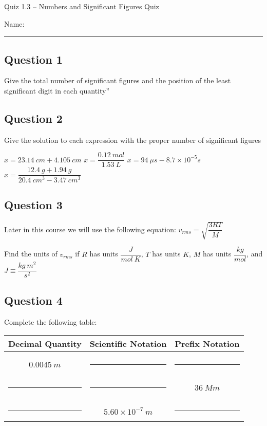 \documentclass[11pt, letterpaper]{memoir}
\begin{document}
\begin{center}
	{\large	Quiz 1.3 -- Numbers and Significant Figures Quiz}
\end{center}
{\large Name: \rule[-1mm]{4in}{.1pt}
\subsection*{Question 1}
Give the total number of significant figures and the position of the least significant digit in each quantity”


\vspace{3em}
\subsection*{Question 2}
Give the solution to each expression with the proper number of significant figures

\noindent$x = 23.14~cm+4.105~cm$ \hspace{2em} $x = \dfrac{0.12~mol}{1.53~L}$ \hspace{2em} $x=94~\mu s - 8.7\times10^{-5}s$ \hspace{2em} $x=\dfrac{12.4~g+1.94~g}{20.4~cm^3-3.47~cm^3}$

\vspace{3em}
\subsection*{Question 3}
Later in this course we will use the following equation: $v_{rms}=\sqrt{\dfrac{3RT}{M}}$

\noindent Find the units of $v_{rms}$ if $R$ has units $\dfrac{J}{mol~K}$, $T$ has units $K$, $M$ has units $\dfrac{kg}{mol}$, and $J\equiv \dfrac{kg~m^2}{s^2}$

\vspace{3em}
\subsection*{Question 4}
Complete the following table:

\begin{tabular}{ccc}
	Decimal Quantity      & Scientific Notation   & Prefix Notation       \\ \midrule \\
	$0.0045~m$            & \rule[-2pt]{8em}{1pt} & \rule[-2pt]{8em}{1pt} \\ \\
	\rule[-2pt]{8em}{1pt} & \rule[-2pt]{8em}{1pt} & $36~Mm$               \\ \\
	\rule[-2pt]{8em}{1pt} & $5.60\times10^{-7}~m$ & \rule[-2pt]{8em}{1pt} \\
\end{tabular}



}
\end{document}
